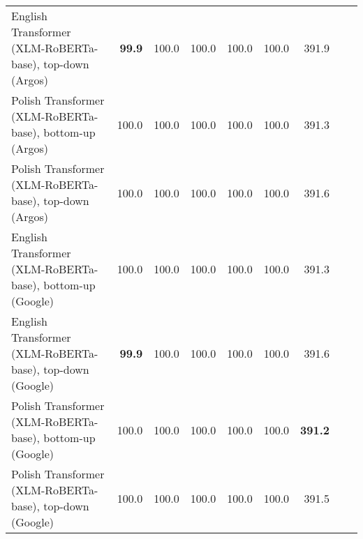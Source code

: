 \begin{table}[ht!]
{\begin{tabular}{lrrrrrrrr}
  English Transformer (XLM-RoBERTa-base), top-down (Argos) & \textbf{99.9} & 100.0 & 100.0 & 100.0 & 100.0 & 391.9 \\ 
  Polish Transformer (XLM-RoBERTa-base), bottom-up (Argos) & 100.0 & 100.0 & 100.0 & 100.0 & 100.0 & 391.3 \\ 
  Polish Transformer (XLM-RoBERTa-base), top-down (Argos) & 100.0 & 100.0 & 100.0 & 100.0 & 100.0 & 391.6 \\ 
  English Transformer (XLM-RoBERTa-base), bottom-up (Google) & 100.0 & 100.0 & 100.0 & 100.0 & 100.0 & 391.3 \\ 
  English Transformer (XLM-RoBERTa-base), top-down (Google) & \textbf{99.9} & 100.0 & 100.0 & 100.0 & 100.0 & 391.6 \\ 
  Polish Transformer (XLM-RoBERTa-base), bottom-up (Google) & 100.0 & 100.0 & 100.0 & 100.0 & 100.0 & \textbf{391.2} \\ 
  Polish Transformer (XLM-RoBERTa-base), top-down (Google) & 100.0 & 100.0 & 100.0 & 100.0 & 100.0 & 391.5 \\ 
   \hline
\end{tabular}
}
\end{table}




